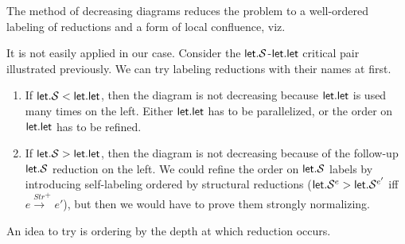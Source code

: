 \documentclass[a4paper, 11pt,titlepage, openright, twoside]{report}
\newcommand{\keyword}[1]{\textsf{\textup{#1}}}
\newcommand{\KwLet}{\keyword{let}}
\renewcommand{\S}{\mathcal{S}}
\newcommand{\+}{\enspace}
\begin{document}
The method of decreasing diagrams \cite{dd} reduces the problem to a well-ordered
labeling of reductions and a form of local confluence, viz.
\begin{center}
\end{center}
It is not easily applied in our case.
Consider the $\KwLet{}.\S$-$\KwLet{}.\KwLet{}$ critical pair illustrated previously.
We can try labeling reductions with their names at first.
\begin{enumerate}
	\item
If $\KwLet{}.\S < \KwLet{}.\KwLet{}$, then
the diagram is not decreasing because $\KwLet{}.\KwLet{}$ is used many times on the left.
Either $\KwLet{}.\KwLet{}$ has to be parallelized, or the order on $\KwLet{}.\KwLet{}$ has to be refined.
	\item
	If $\KwLet{}.\S > \KwLet{}.\KwLet{}$, then
the diagram is not decreasing because of the follow-up $\KwLet{}.\S$ reduction on the left.
We could refine the order on $\KwLet{}.\S$ labels by introducing
self-labeling ordered by structural reductions
($\KwLet{}.\S^e > \KwLet{}.\S^{e'}$ iff $e \xrightarrow{Str}^+ e'$),
but then we would have to prove them strongly normalizing.
\end{enumerate}
An idea to try is ordering by the depth at which reduction occurs.
\end{document}
